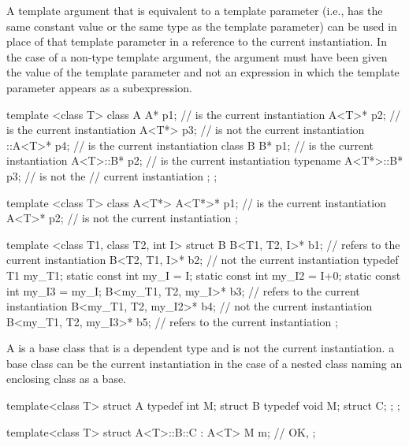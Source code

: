 \pnum
A template argument that is equivalent to a template
parameter (i.e., has the same constant value or the same type
as the template parameter) can be used in place of that
template parameter in a reference to the current
instantiation. In the case of a non-type template argument,
the argument must have been given the value of the
template parameter and not an expression in which the
template parameter appears as a subexpression.
\enterexample
\begin{codeblock}
template <class T> class A {
  A* p1;                        //  is the current instantiation
  A<T>* p2;                     //  is the current instantiation
  A<T*> p3;                     //  is not the current instantiation
  ::A<T>* p4;                   //  is the current instantiation
  class B {
    B* p1;                      //  is the current instantiation
    A<T>::B* p2;                //  is the current instantiation
    typename A<T*>::B* p3;      //  is not the
                                // current instantiation
  };
};

template <class T> class A<T*> {
  A<T*>* p1;                    //  is the current instantiation
  A<T>* p2;                     //  is not the current instantiation
};

template <class T1, class T2, int I> struct B {
  B<T1, T2, I>* b1;             // refers to the current instantiation
  B<T2, T1, I>* b2;             // not the current instantiation
  typedef T1 my_T1;
  static const int my_I = I;
  static const int my_I2 = I+0;
  static const int my_I3 = my_I;
  B<my_T1, T2, my_I>* b3;       // refers to the current instantiation
  B<my_T1, T2, my_I2>* b4;      // not the current instantiation
  B<my_T1, T2, my_I3>* b5;      // refers to the current instantiation
};
\end{codeblock}
\exitexample

\pnum
{}%
A  is a base class that is a dependent type and is
not the current instantiation.
\enternote
a base class can be the current instantiation in the case of a nested class
naming an enclosing class as a base.
\enterexample
\begin{codeblock}
template<class T> struct A {
  typedef int M;
  struct B {
    typedef void M;
    struct C;
  };
};

template<class T> struct A<T>::B::C : A<T> {
  M m; // OK, 
};
\end{codeblock}
\exitexample
\exitnote

